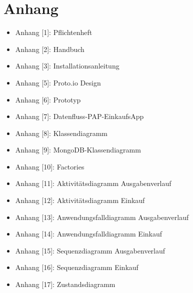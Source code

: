 \documentclass[12pt,a4paper]{article}
\begin{document}
\section*{Anhang}
\begin{itemize}
\item Anhang [1]: Pflichtenheft
\item Anhang [2]: Handbuch
\item Anhang [3]: Installationsanleitung
\item Anhang [5]: Proto.io Design
\item Anhang [6]: Prototyp
\item Anhang [7]: Datenfluss-PAP-EinkaufsApp
\item Anhang [8]: Klassendiagramm
\item Anhang [9]: MongoDB-Klassendiagramm
\item Anhang [10]: Factories
\item Anhang [11]: Aktivitätsdiagramm Ausgabenverlauf
\item Anhang [12]: Aktivitätsdiagramm Einkauf 
\item Anhang [13]: Anwendungsfalldiagramm  Ausgabenverlauf
\item Anhang [14]: Anwendungsfalldiagramm Einkauf 
\item Anhang [15]: Sequenzdiagramm Ausgabenverlauf
\item Anhang [16]: Sequenzdiagramm Einkauf
\item Anhang [17]: Zustandsdiagramm 





\end{itemize}
\end{document}
